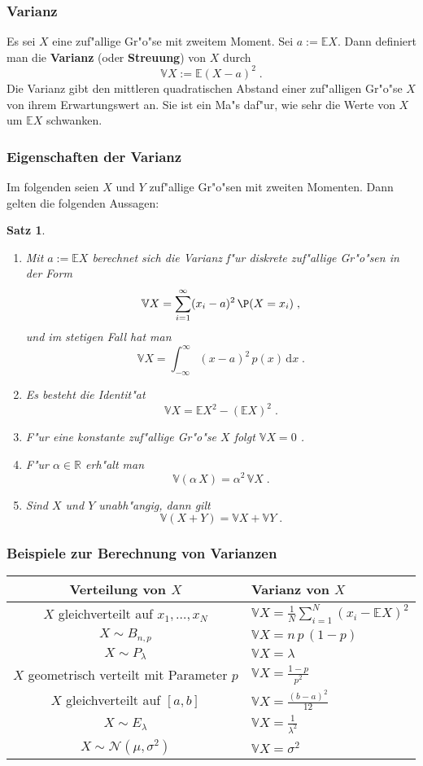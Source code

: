 \documentclass[ngerman,draft,parskip=half,twoside]{scrartcl}
\newtheorem{thm}{Satz}[section]
\newcommand*{\R}{\mathbb{R}}      %
\newcommand*{\E}{\mathbb{E}}        %
\newcommand*{\V}{\mathbb{V}}        %
\begin{document}
\subsubsection{Varianz}
Es sei $X$ eine zuf"allige Gr"o"se mit zweitem Moment. Sei $a:=\E X$. Dann definiert man
die \textbf{Varianz} (oder \textbf{Streuung}) von $X$ durch
$$
\V X:= \E(X-a)^2\;.
$$
Die Varianz gibt den mittleren quadratischen Abstand einer zuf"alligen Gr"o"se $X$ von ihrem
Erwartungswert an. Sie ist ein Ma"s daf"ur, wie sehr die Werte von $X$ um $\E X$ schwanken.

\subsubsection{Eigenschaften der Varianz}
Im folgenden seien $X$ und $Y$ zuf"allige Gr"o"sen mit zweiten Momenten. Dann gelten die
folgenden Aussagen$\colon$
\begin{thm}~
\begin{enumerate}
\item
Mit $a:=\E X$ berechnet sich die Varianz f"ur diskrete zuf"allige Gr"o"sen in der Form
$$
\V X = \sum_{i=1}^\infty (x_i-a)^2\,\P(X=x_i)\;,
$$
und im stetigen Fall hat man
$$
\V X =\int_{-\infty}^\infty (x-a)^2\,p(x)\,\mathrm d x\;.
$$
\item
Es besteht die Identit"at
$$
\V X = \E X^2 -(\E X)^2\;.
$$
\item
F"ur eine konstante zuf"allige Gr"o"se $X$ folgt $\V X=0$ .
\item
F"ur $\alpha\in\R$ erh"alt man
$$
\V(\alpha\,X)=\alpha^2\,\V X\;.
$$
\item
Sind $X$ und $Y$ unabh"angig, dann gilt
$$
\V(X+Y)=\V X + \V Y\;.
$$
\end{enumerate}

\end{thm}
\subsubsection{Beispiele zur Berechnung von Varianzen}

\medskip

{\renewcommand{\arraystretch}{1.4}
\begin{center}
\begin{tabular}{|c|l|}\hline
\bf Verteilung von $X$& \bf Varianz von $X$\\ \hline\hline
$X$ gleichverteilt auf $x_1,\ldots,x_N$& $\V X=\frac{1}{N}\sum_{i=1}^N (x_i-\E X)^2$\\ \hline
$X\sim B_{n,p}$& $\V X= n\,p\,(1-p)$\\ \hline
$X\sim P_\lambda$&$\V X= \lambda$\\ \hline
$X$ geometrisch verteilt mit Parameter $p$& $\V X = \frac{1-p}{p^2}$\\ \hline
$X$ gleichverteilt auf $[a,b]$& $\V X= \frac{(b-a)^2}{12}$\\ \hline
$X\sim E_\lambda$& $\V X = \frac{1}{\lambda^2}$\\ \hline
$X\sim \mathcal N(\mu,\sigma^2)$&$ \V X = \sigma^2$\\ \hline
\end{tabular}
\end{center}
}
\end{document}
